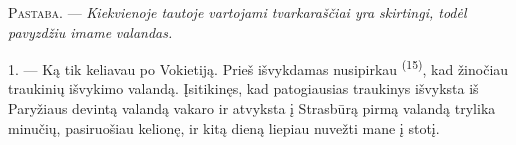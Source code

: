 %
%
%
%
%
%

\VUsaut{4.0mm}
\VUsaut{2.4mm}
\VUsaut{3.4mm}
\textsc{Pastaba.} --- \textit{Kiekvienoje tautoje vartojami tvarkaraščiai yra
skirtingi, todėl pavyzdžiu imame}  \textit{valandas.}

1. --- Ką tik keliavau po Vokietiją. Prieš išvykdamas nusipirkau  \textsuperscript{(15)}, kad žinočiau traukinių išvykimo valandą. Įsitikinęs,
kad patogiausias traukinys išvyksta iš Paryžiaus devintą valandą vakaro ir atvyksta į
Strasbūrą pirmą valandą trylika minučių, pasiruošiau kelionę, ir kitą dieną liepiau
nuvežti mane į stotį.

